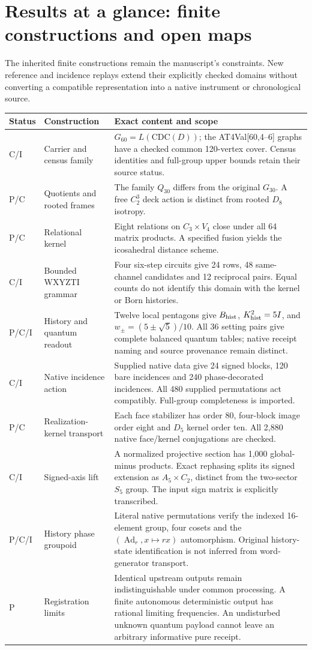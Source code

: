 \section*{Results at a glance: finite constructions and open maps}
The inherited finite constructions remain the manuscript's constraints. New reference and incidence replays extend their explicitly checked domains without converting a compatible representation into a native instrument or chronological source.

\smallskip\small
\noindent\begin{tabularx}{\textwidth}{@{}p{}p{}X@{}}
\toprule
Status & Construction & Exact content and scope \\
\midrule
C/I & Carrier and census family & $G_{60}=L(\mathrm{CDC}(D))$; the AT4Val[60,4--6] graphs have a checked common 120-vertex cover. Census identities and full-group upper bounds retain their source status. \\
P/C & Quotients and rooted frames & The family $Q_{30}$ differs from the original $G_{30}$. A free $C_2^3$ deck action is distinct from rooted $D_8$ isotropy. \\
P/C & Relational kernel & Eight relations on $C_3\times V_4$ close under all 64 matrix products. A specified fusion yields the icosahedral distance scheme. \\
C/I & Bounded WXYZTI grammar & Four six-step circuits give 24 rows, 48 same-channel candidates and 12 reciprocal pairs. Equal counts do not identify this domain with the kernel or Born histories. \\
P/C/I & History and quantum readout & Twelve local pentagons give $B_{\rm hist}$, $K_{\rm hist}^2=5I$, and $w_\pm=(5\pm\sqrt5)/10$. All 36 setting pairs give complete balanced quantum tables; native receipt naming and source provenance remain distinct. \\
C/I & Native incidence action & Supplied native data give 24 signed blocks, 120 bare incidences and 240 phase-decorated incidences. All 480 supplied permutations act compatibly. Full-group completeness is imported. \\
P/C & Realization-kernel transport & Each face stabilizer has order 80, four-block image order eight and $D_5$ kernel order ten. All 2,880 native face/kernel conjugations are checked. \\
C/I & Signed-axis lift & A normalized projective section has 1,000 global-minus products. Exact rephasing splits its signed extension as $A_5\times C_2$, distinct from the two-sector $S_5$ group. The input sign matrix is explicitly transcribed. \\
P/C/I & History phase groupoid & Literal native permutations verify the indexed 16-element group, four cosets and the $(\operatorname{Ad}_r,x\mapsto rx)$ automorphism. Original history-state identification is not inferred from word-generator transport. \\
P & Registration limits & Identical upstream outputs remain indistinguishable under common processing. A finite autonomous deterministic output has rational limiting frequencies. An undisturbed unknown quantum payload cannot leave an arbitrary informative pure receipt. \\
\bottomrule
\end{tabularx}
